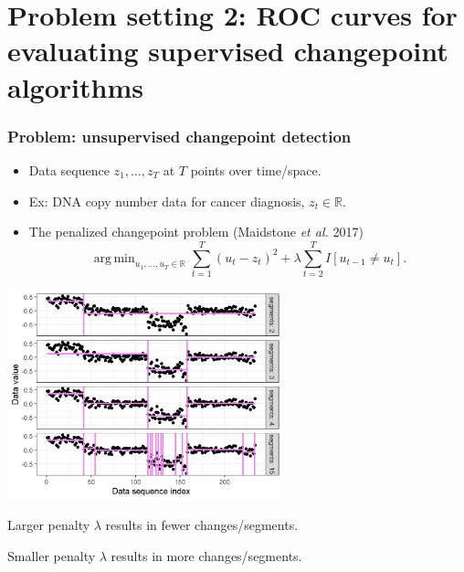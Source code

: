 \documentclass[t]{beamer}
\DeclareMathOperator*{\argmin}{arg\,min}
\begin{document}
\section{Problem setting 2: ROC curves for evaluating supervised changepoint algorithms}

\begin{frame}
  \frametitle{Problem: unsupervised changepoint detection}
  \begin{itemize}
  \item Data sequence $z_1,\dots,z_T$ at $T$ points over time/space.
  \item Ex: DNA copy number data for cancer diagnosis, $z_t\in\mathbb R$.
  \item The penalized changepoint problem (Maidstone \emph{et al.} 2017)
$$\argmin_{u_1,\dots,u_T\in\mathbb R} \sum_{t=1}^T (u_t - z_t)^2 + \lambda\sum_{t=2}^T I[u_{t-1} \neq u_t].$$
  \end{itemize}

  \parbox{0.6\textwidth}{
\includegraphics[width=0.6\textwidth]{figure-fn-not-monotonic-no-labels}
}
\parbox{0.3\textwidth}{
  Larger penalty $\lambda$ results in fewer changes/segments.

  \vskip 0.5in

  Smaller penalty $\lambda$ results in more changes/segments.
}

\end{frame}
\end{document}
